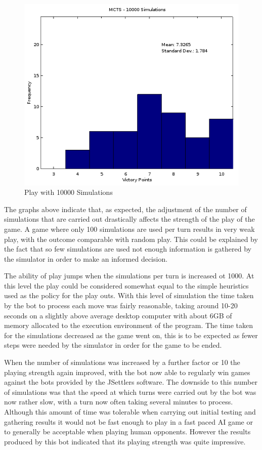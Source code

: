 \documentclass[]{article}
\begin{document}
\begin{center}
\begin{figure}[H]
 \centerline{\includegraphics[width=0.75\linewidth]{figures/mcts10000}}
  \caption{Play with 10000 Simulations}
  \label{fig:mcts10000} 
\end{figure}
\end{center}

\par The graphs above indicate that, as expected, the adjustment of the number of simulations that are carried out drastically affects the strength of the play of the game. A game where only 100 simulations are used per turn results in very weak play, with the outcome comparable with random play. This could be explained by the fact that so few simulations are used not enough information is gathered by the simulator in order to make an informed decision. 

\par The ability of play jumps when the simulations per turn is increased ot 1000. At this level the play could be considered somewhat equal to the simple heuristics used as the policy for the play outs. With this level of simulation the time taken by the bot to process each move was fairly reasonable, taking around 10-20 seconds on a slightly above average desktop computer with about 6GB of memory allocated to the execution environment of the program. The time taken for the simulations decreased as the game went on, this is to be expected as fewer steps were needed by the simulator in order for the game to be ended.

\par When the number of simulations was increased by a further factor or 10 the playing strength again improved, with the bot now able to regularly win games against the bots provided by the JSettlers software. The downside to this number of simulations was that the speed at which turns were carried out by the bot was now rather slow, with a turn now often taking several minutes to process. Although this amount of time was tolerable when carrying out initial testing and gathering results it would not be fast enough to play in a fast paced AI game or to generally be acceptable when playing human opponents. However the results produced by this bot indicated that its playing strength was quite impressive.
\end{document}
